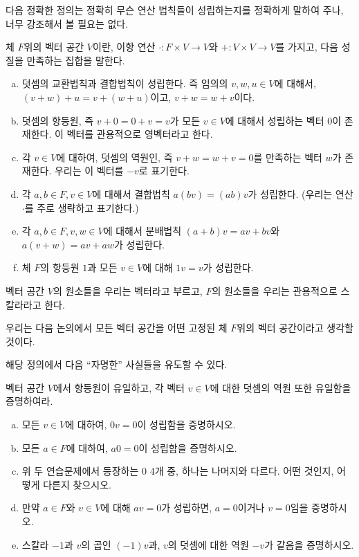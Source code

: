 다음 정확한 정의는 정확히 무슨 연산 법칙들이 성립하는지를 정확하게 말하여 주나, 너무 강조해서 볼 필요는 없다.
\begin{definition}
\label{def:vecspace}
    체 $F$위의 벡터 공간 $V$이란, 이항 연산 $\cdot : F \times V \to V$와 $+ : V \times V \to V$를 가지고, 다음 성질을 만족하는 집합을 말한다.
    \begin{enumerate}[(a)]
        \item 덧셈의 교환법칙과 결합법칙이 성립한다.
        즉 임의의 $v, w, u \in V$에 대해서, $(v + w) + u = v + (w + u)$이고, $v + w = w + v$이다.
        \item 덧셈의 항등원, 즉 $v + 0 = 0 + v = v$가 모든 $v \in V$에 대해서 성립하는 벡터 $0$이 존재한다.
        이 벡터를 관용적으로 영벡터라고 한다.
        \item 각 $v \in V$에 대하여, 덧셈의 역원인, 즉 $v + w = w + v = 0$를 만족하는 벡터 $w$가 존재한다.
        우리는 이 벡터를 $-v$로 표기한다.
        \item 각 $a, b \in F, v \in V$에 대해서 결합법칙 $a(bv) = (ab)v$가 성립한다. (우리는 연산 $\cdot$를 주로 생략하고 표기한다.)
        \item 각 $a, b \in F, v, w \in V$에 대해서 분배법칙 $(a + b)v = av + bv$와 $a(v + w) = av + aw$가 성립한다.
        \item 체 $F$의 항등원 $1$과 모든 $v \in V$에 대해 $1v = v$가 성립한다.
    \end{enumerate}
    벡터 공간 $V$의 원소들을 우리는 벡터라고 부르고, $F$의 원소들을 우리는 관용적으로 스칼라라고 한다.
\end{definition}
우리는 다음 논의에서 모든 벡터 공간을 어떤 고정된 체 $F$위의 벡터 공간이라고 생각할 것이다.

해당 정의에서 다음 ``자명한'' 사실들을 유도할 수 있다.
\begin{exercise}
    벡터 공간 $V$에서 항등원이 유일하고, 각 벡터 $v \in V$에 대한 덧셈의 역원 또한 유일함을 증명하여라.
\end{exercise}
\begin{exercise}
    \begin{enumerate}[(a)]
        \item 모든 $v \in V$에 대하여, $0v = 0$이 성립함을 증명하시오.
        \item 모든 $a \in F$에 대하여, $a0 = 0$이 성립함을 증명하시오.
        \item 위 두 연습문제에서 등장하는 $0$ 4개 중, 하나는 나머지와 다르다.
        어떤 것인지, 어떻게 다른지 찾으시오.
        \item 만약 $a \in F$와 $v \in V$에 대해 $av = 0$가 성립하면, $a = 0$이거나 $v = 0$임을 증명하시오.
        \item 스칼라 $-1$과 $v$의 곱인 $(-1)v$과, $v$의 덧셈에 대한 역원 $-v$가 같음을 증명하시오.
    \end{enumerate}
\end{exercise}

